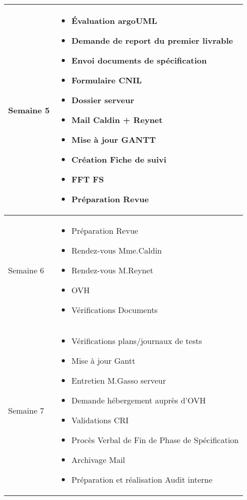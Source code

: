 \documentclass [a4paper] {article}
\begin{document}
\section*{\Sergi}

\begin{tabularx}{16.8cm}{|>{\columncolor{gray!40}}l|X|}
	\hline
	Semaine 5 & \begin{itemize}
		\item Évaluation argoUML
		\item Demande de report du premier livrable
		\item Envoi documents de spécification
		\item Formulaire CNIL
		\item Dossier serveur
		\item Mail Caldin + Reynet
		\item Mise à jour GANTT
		\item Création Fiche de suivi
		\item FFT FS
		\item Préparation Revue
	\end{itemize} \\
	\hline
	Semaine 6 & \begin{itemize}
		\item Préparation Revue
		\item Rendez-vous Mme.Caldin
		\item Rendez-vous M.Reynet
		\item OVH
		\item Vérifications Documents
	\end{itemize} \\
	\hline
	Semaine 7 & \begin{itemize}
		\item Vérifications plans/journaux de tests
		\item Mise à jour Gantt
		\item Entretien M.Gasso serveur
		\item Demande hébergement auprès d'OVH
		\item Validations CRI
		\item Procès Verbal de Fin de Phase de Spécification
		\item Archivage Mail
		\item Préparation et réalisation Audit interne
	\end{itemize} \\
	\hline
\end{tabularx}
\end{document}
